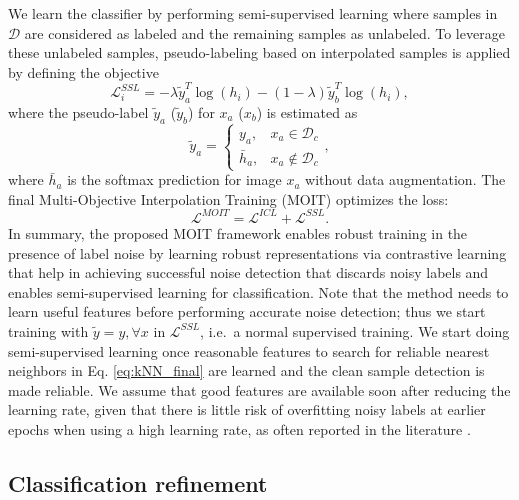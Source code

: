 \documentclass[final]{cvpr}
\begin{document}
We learn the classifier by performing semi-supervised learning where samples in $\mathcal{D}$ are considered as labeled and the remaining samples as unlabeled. To leverage these unlabeled samples, pseudo-labeling \cite{2020_IJCNN_Pseudo} based on interpolated samples is applied by defining the objective
\begin{equation}
\mathcal{L}_{i}^{\mathit{SSL}}=-\lambda\tilde{y}_{a}^{T}\log\left(h_{i}\right)-\left(1-\lambda\right)\tilde{y}_{b}^{T}\log\left(h_{i}\right),\label{eq:SSL}
\end{equation}
where the pseudo-label $\tilde{y}_{a}$ ($\tilde{y}_{b}$) for
$x_{a}$ ($x_{b}$) is estimated as
\begin{equation}
\tilde{y}_{a}=\begin{cases}
y_{a}, & x_{a}\in\mathcal{D}_{c}\\
\bar{h}_{a}, & x_{a}\notin\mathcal{D}_{c}
\end{cases},
\end{equation}
where $\bar{h}_{a}$ is the softmax prediction for image $x_{a}$ without data augmentation. The final Multi-Objective Interpolation Training (MOIT)  optimizes the loss:
\begin{equation}
\mathcal{L}^{\mathit{MOIT}}=\mathcal{L}^{\mathit{ICL}}+\mathcal{L}^{\mathit{SSL}}.\label{eq:FinalLoss}
\end{equation}
In summary, the proposed MOIT framework enables robust training in the presence of label noise by learning robust representations via contrastive learning that help in achieving successful noise detection that discards noisy labels and enables semi-supervised learning for classification. Note that the method needs to learn useful features before performing accurate noise detection; thus we start training with $\tilde{y}=y,\forall x$ in $\mathcal{L}^{\mathit{SSL}}$, i.e.~a normal supervised training. We start doing semi-supervised learning once reasonable features to search for reliable nearest neighbors in Eq. \ref{eq:kNN_final} are learned and the clean sample detection is made reliable. We assume that good features are available soon after reducing the learning rate, given that there is little risk of overfitting noisy labels at earlier epochs when using a high learning rate, as often reported in the literature
\cite{2018_CVPR_JointOpt,2019_CVPR_JointOptimizImproved,2019_ICML_DynamicBootstrapping}.

\subsection{Classification refinement\label{subsec:Classification-refinement}}
\end{document}
